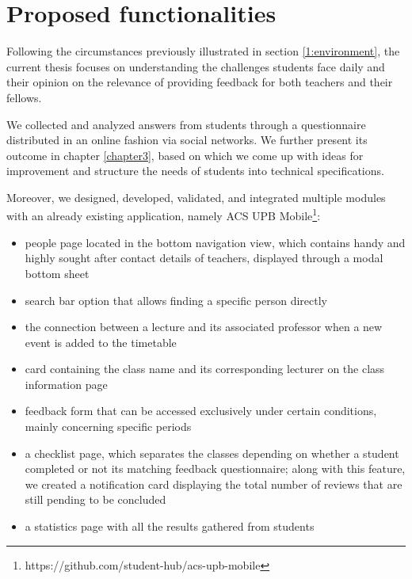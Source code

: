 \section{Proposed functionalities} \label{1:functionalities}

    Following the circumstances previously illustrated in section \ref{1:environment}, the current thesis focuses on understanding the challenges students face daily and their opinion on the relevance of providing feedback for both teachers and their fellows.
    
    We collected and analyzed answers from students through a questionnaire distributed in an online fashion via social networks. We further present its outcome in chapter \ref{chapter3}, based on which we come up with ideas for improvement and structure the needs of students into technical specifications.
    
    Moreover, we designed, developed, validated, and integrated multiple modules with an already existing application, namely ACS UPB Mobile\footnote{https://github.com/student-hub/acs-upb-mobile}:
    
    \begin{itemize}
            \setlength{\topsep}{0.5pt}
            \setlength{\itemsep}{0.5pt}
            \setlength{\parsep}{0.5pt}
            \item people page located in the bottom navigation view, which contains handy and highly sought after contact details of teachers, displayed through a modal bottom sheet 
            \item search bar option that allows finding a specific person directly
            \item the connection between a lecture and its associated professor when a new event is added to the timetable
            \item card containing the class name and its corresponding lecturer on the class information page
            \item feedback form that can be accessed exclusively under certain conditions, mainly concerning specific periods
            \item a checklist page, which separates the classes depending on whether a student completed or not its matching feedback questionnaire; along with this feature, we created a notification card displaying the total number of reviews that are still pending to be concluded
            \item a statistics page with all the results gathered from students
\end{itemize}

